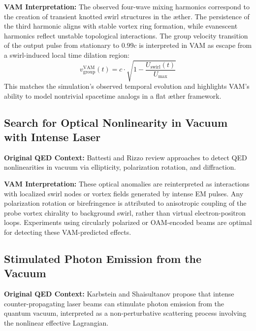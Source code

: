 \textbf{VAM Interpretation:} The observed four-wave mixing harmonics correspond to the creation of transient knotted swirl structures in the \ae{}ther. The persistence of the third harmonic aligns with stable vortex ring formation, while evanescent harmonics reflect unstable topological interactions. The group velocity transition of the output pulse from stationary to $0.99c$ is interpreted in VAM as escape from a swirl-induced local time dilation region:
\begin{equation}
v_\text{group}^\text{VAM}(t) = c \cdot \sqrt{1 - \frac{U_\text{swirl}(t)}{U_\text{max}}}
\end{equation}
This matches the simulation's observed temporal evolution and highlights VAM's ability to model nontrivial spacetime analogs in a flat \ae{}ther framework.

\subsection{Search for Optical Nonlinearity in Vacuum with Intense Laser~\cite{battesti2013search}}

\textbf{Original QED Context:} Battesti and Rizzo review approaches to detect QED nonlinearities in vacuum via ellipticity, polarization rotation, and diffraction.

\textbf{VAM Interpretation:} These optical anomalies are reinterpreted as interactions with localized swirl nodes or vortex fields generated by intense EM pulses. Any polarization rotation or birefringence is attributed to anisotropic coupling of the probe vortex chirality to background swirl, rather than virtual electron-positron loops. Experiments using circularly polarized or OAM-encoded beams are optimal for detecting these VAM-predicted effects.

\subsection{Stimulated Photon Emission from the Vacuum~\cite{karbstein2016stimulated}}

\textbf{Original QED Context:} Karbstein and Shaisultanov propose that intense counter-propagating laser beams can stimulate photon emission from the quantum vacuum, interpreted as a non-perturbative scattering process involving the nonlinear effective Lagrangian.

